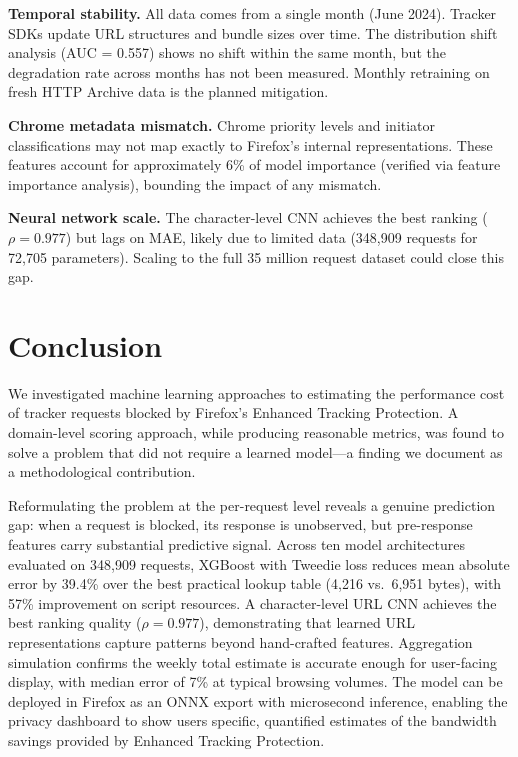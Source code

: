 \documentclass[11pt]{article}
\begin{document}
\textbf{Temporal stability.} All data comes from a single month (June 2024). Tracker SDKs update URL structures and bundle sizes over time. The distribution shift analysis (AUC = 0.557) shows no shift within the same month, but the degradation rate across months has not been measured. Monthly retraining on fresh HTTP Archive data is the planned mitigation.

\textbf{Chrome metadata mismatch.} Chrome priority levels and initiator classifications may not map exactly to Firefox's internal representations. These features account for approximately 6\% of model importance (verified via feature importance analysis), bounding the impact of any mismatch.

\textbf{Neural network scale.} The character-level CNN achieves the best ranking ($\rho = 0.977$) but lags on MAE, likely due to limited data (348,909 requests for 72,705 parameters). Scaling to the full 35 million request dataset could close this gap.


\section{Conclusion}
\label{sec:conclusion}

We investigated machine learning approaches to estimating the performance cost of tracker requests blocked by Firefox's Enhanced Tracking Protection. A domain-level scoring approach, while producing reasonable metrics, was found to solve a problem that did not require a learned model---a finding we document as a methodological contribution.

Reformulating the problem at the per-request level reveals a genuine prediction gap: when a request is blocked, its response is unobserved, but pre-response features carry substantial predictive signal. Across ten model architectures evaluated on 348,909 requests, XGBoost with Tweedie loss reduces mean absolute error by 39.4\% over the best practical lookup table (4,216 vs.\ 6,951 bytes), with 57\% improvement on script resources. A character-level URL CNN achieves the best ranking quality ($\rho = 0.977$), demonstrating that learned URL representations capture patterns beyond hand-crafted features. Aggregation simulation confirms the weekly total estimate is accurate enough for user-facing display, with median error of 7\% at typical browsing volumes. The model can be deployed in Firefox as an ONNX export with microsecond inference, enabling the privacy dashboard to show users specific, quantified estimates of the bandwidth savings provided by Enhanced Tracking Protection.




\end{document}
